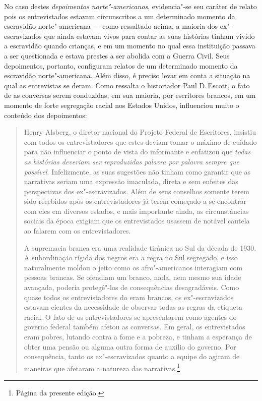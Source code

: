No caso destes \textit{depoimentos norte"-americanos}, evidencia"-se seu caráter
de relato pois os entrevistados estavam circunscritos a um determinado momento da escravidão norte"-americana --- como ressaltado acima, a maioria dos ex"-escravizados que ainda estavam vivos para contar as suas histórias tinham vivido a escravidão quando crianças, e em um momento no qual essa instituição passava a ser questionada e estava prestes a ser abolida com a Guerra Civil. Seus depoimentos, portanto, configuram relatos de um determinado momento da escravidão norte"-americana.
Além disso, é preciso levar em conta a situação na qual as entrevistas se deram.
Como ressalta o historiador Paul D.\,Escott, o fato de as conversas serem conduzidas, em sua maioria, por escritores brancos, em um momento de forte segregação racial nos Estados Unidos, influenciou muito o conteúdo dos depoimentos:

\begin{quote}
Henry Alsberg, o diretor nacional do Projeto Federal de Escritores,
insistiu com todos os entrevistadores que estes deviam tomar o máximo de
cuidado para não influenciar o ponto de vista do informante e enfatizou
que \emph{todas as histórias deveriam ser reproduzidas palavra por
palavra sempre que possível}. Infelizmente, as suas sugestões não tinham
como garantir que as narrativas seriam uma expressão imaculada, direta e
sem enfeites das perspectivas dos ex"-escravizados. Além de seus conselhos
somente terem sido recebidos após os entrevistadores já terem começado a
se encontrar com eles em diversos estados, e mais importante
ainda, as circunstâncias sociais da época exigiam que os entrevistados
usassem de notável cautela ao falarem com os entrevistadores.

A supremacia branca era uma realidade tirânica no Sul da década de 1930.
A subordinação rígida dos negros era a regra no Sul segregado, e isso
naturalmente moldou o jeito como os afro"-americanos interagiam com
pessoas brancas. Se ofendiam um branco, nada, nem mesmo sua idade avançada, poderia protegê"-los de consequências desagradáveis.
Como quase todos os entrevistadores do  eram brancos, os ex"-escravizados
estavam cientes da necessidade de observar todas as regras da etiqueta
racial. O fato de os entrevistadores se apresentarem como agentes do
governo federal também afetou as conversas. Em geral, os entrevistados
eram pobres, lutando contra a fome e a pobreza, e tinham a esperança de
obter uma pensão ou alguma outra forma de auxílio do governo. Por
consequência, tanto os ex"-escravizados quanto a equipe do  agiram de
maneiras que afetaram a natureza das narrativas.\footnote{Página \pageref{henry} da presente edição.}
\end{quote}

